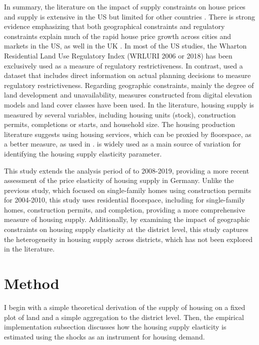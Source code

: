 \documentclass[
  12pt,
]{article}
\begin{document}
In summary, the literature on the impact of supply constraints on house
prices and supply is extensive in the US but limited for other countries
\citep{hilber_vermeulen_2016}. There is strong evidence emphasizing that
both geographical constraints \citep[see][]{saiz_2010, paciorek_2013}
and regulatory constraints
\citep[see][]{glaeser_gyourko_2005, paciorek_2013, gyourko_etal_2021, glaeser_2020}
explain much of the rapid house price growth across cities and markets
in the US, as well in the UK \citep{hilber_vermeulen_2016}. In most of
the US studies, the Wharton Residential Land Use Regulatory Index
(WRLURI 2006 or 2018) has been exclusively used as a measure of
regulatory restrictiveness. In contrast, \citet{hilber_vermeulen_2016}
used a dataset that includes direct information on actual planning
decisions to measure regulatory restrictiveness. Regarding geographic
constraints, mainly the degree of land development and unavailability,
measures constructed from digital elevation models and land cover
classes have been used. In the literature, housing supply is measured by
several variables, including housing units (stock), construction
permits, completions or starts, and household size. The housing
production literature \citep[see][]{epple_etal_2010, combes_etal_2021}
suggests using housing services, which can be proxied by floorspace, as
a better measure, as used in \citet{baum-snow_han_2019}.
\citet{bartik_1991} is widely used as a main source of variation for
identifying the housing supply elasticity parameter.

This study extends the analysis period of \citet{lerbs_2014} to
2008-2019, providing a more recent assessment of the price elasticity of
housing supply in Germany. Unlike the previous study, which focused on
single-family homes using construction permits for 2004-2010, this study
uses residential floorspace, including for single-family homes,
construction permits, and completion, providing a more comprehensive
measure of housing supply. Additionally, by examining the impact of
geographic constraints on housing supply elasticity at the district
level, this study captures the heterogeneity in housing supply across
districts, which has not been explored in the literature.

\section{Method}\label{method}

I begin with a simple theoretical derivation of the supply of housing on
a fixed plot of land and a simple aggregation to the district level.
Then, the empirical implementation subsection discusses how the housing
supply elasticity is estimated using the \citet{bartik_1991} shocks as
an instrument for housing demand.
\end{document}
